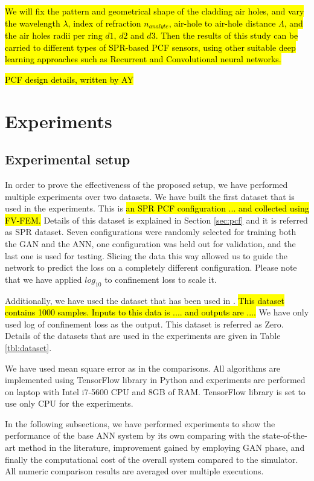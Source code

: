 \documentclass[draft, 10pt]{IEEEtran}
\begin{document}
\hl{We will fix the pattern and geometrical shape of the cladding air holes, and vary the wavelength $\lambda$, index of refraction $n_{analyte} $, air-hole to air-hole distance $ \Lambda $, and the air holes radii per ring $d1$, $d2$ and $d3$. Then the results of this study can be carried to different types of SPR-based PCF sensors, using other suitable deep learning approaches such as Recurrent and Convolutional neural networks. }

\hl{PCF design details, written by AY}

\section{Experiments}
\label{sec:exp}

\subsection{Experimental setup}

\def\dszero{Zero}

In order to prove the effectiveness of the proposed setup, we have performed multiple experiments over two datasets. We have built the first dataset that is used in the experiments. This is \hl{an SPR PCF configuration ... and collected using FV-FEM.} Details of this dataset is explained in Section \ref{sec:pcf} and it is referred as SPR dataset. Seven configurations were randomly selected for training both the GAN and the ANN, one configuration was held out for validation, and the last one is used for testing. Slicing the data this way allowed us to guide the network to predict the loss on a completely different configuration. Please note that we have applied $log_{10}$ to confinement loss to scale it.

Additionally, we have used the dataset that has been used in \cite{paper0}. \hl{This dataset contains 1000 samples. Inputs to this data is .... and outputs are ....} We have only used log of confinement loss as the output. This dataset is referred as \dszero. Details of the datasets that are used in the experiments are given in Table \ref{tbl:dataset}.

We have used mean square error as in the comparisons. All algorithms are implemented using TensorFlow library in Python and experiments are performed on laptop with Intel i7-5600 CPU and 8GB of RAM. TensorFlow library is set to use only CPU for the experiments.

In the following subsections, we have performed experiments to show the performance of the base ANN system by its own comparing with the state-of-the-art method in the literature, improvement gained by employing GAN phase, and finally the computational cost of the overall system compared to the simulator. All numeric comparison results are averaged over multiple executions.
\end{document}
